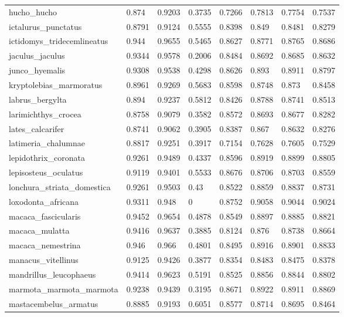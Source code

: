 \documentclass{article}
\begin{document}
\begin{table}[!h]
{\begin{tabular}{@{}llllllll@{}}
hucho\_hucho & 0.874 & 0.9203 & 0.3735 & 0.7266 & 0.7813 & 0.7754 & 0.7537 \\
ictalurus\_punctatus & 0.8791 & 0.9124 & 0.5555 & 0.8398 & 0.849 & 0.8481 & 0.8279 \\
ictidomys\_tridecemlineatus & 0.944 & 0.9655 & 0.5465 & 0.8627 & 0.8771 & 0.8765 & 0.8686 \\
jaculus\_jaculus & 0.9344 & 0.9578 & 0.2006 & 0.8484 & 0.8692 & 0.8685 & 0.8632 \\
junco\_hyemalis & 0.9308 & 0.9538 & 0.4298 & 0.8626 & 0.893 & 0.8911 & 0.8797 \\
kryptolebias\_marmoratus & 0.8961 & 0.9269 & 0.5683 & 0.8598 & 0.8748 & 0.873 & 0.8458 \\
labrus\_bergylta & 0.894 & 0.9237 & 0.5812 & 0.8426 & 0.8788 & 0.8741 & 0.8513 \\
larimichthys\_crocea & 0.8758 & 0.9079 & 0.3582 & 0.8572 & 0.8693 & 0.8677 & 0.8282 \\
lates\_calcarifer & 0.8741 & 0.9062 & 0.3905 & 0.8387 & 0.867 & 0.8632 & 0.8276 \\
latimeria\_chalumnae & 0.8817 & 0.9251 & 0.3917 & 0.7154 & 0.7628 & 0.7605 & 0.7529 \\
lepidothrix\_coronata & 0.9261 & 0.9489 & 0.4337 & 0.8596 & 0.8919 & 0.8899 & 0.8805 \\
lepisosteus\_oculatus & 0.9119 & 0.9401 & 0.5533 & 0.8676 & 0.8706 & 0.8703 & 0.8559 \\
lonchura\_striata\_domestica & 0.9261 & 0.9503 & 0.43 & 0.8522 & 0.8859 & 0.8837 & 0.8731 \\
loxodonta\_africana & 0.9311 & 0.948 & 0 & 0.8752 & 0.9058 & 0.9044 & 0.9024 \\
macaca\_fascicularis & 0.9452 & 0.9654 & 0.4878 & 0.8549 & 0.8897 & 0.8885 & 0.8821 \\
macaca\_mulatta & 0.9416 & 0.9637 & 0.3885 & 0.8124 & 0.876 & 0.8738 & 0.8664 \\
macaca\_nemestrina & 0.946 & 0.966 & 0.4801 & 0.8495 & 0.8916 & 0.8901 & 0.8833 \\
manacus\_vitellinus & 0.9125 & 0.9426 & 0.3877 & 0.8354 & 0.8483 & 0.8475 & 0.8378 \\
mandrillus\_leucophaeus & 0.9414 & 0.9623 & 0.5191 & 0.8525 & 0.8856 & 0.8844 & 0.8802 \\
marmota\_marmota\_marmota & 0.9238 & 0.9439 & 0.3195 & 0.8671 & 0.8922 & 0.8911 & 0.8869 \\
mastacembelus\_armatus & 0.8885 & 0.9193 & 0.6051 & 0.8577 & 0.8714 & 0.8695 & 0.8464 \\

\end{tabular}}
\end{table}
\end{document}
